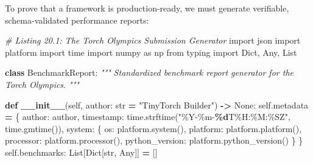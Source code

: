 \documentclass[
  letterpaper,
]{scrbook}
\newenvironment{Shaded}{\begin{snugshade}}{\end{snugshade}}
\newcommand{\BuiltInTok}[1]{#1}
\newcommand{\CommentTok}[1]{\textcolor[rgb]{0.56,0.35,0.01}{\textit{#1}}}
\newcommand{\FunctionTok}[1]{\textcolor[rgb]{0.13,0.29,0.53}{\textbf{#1}}}
\newcommand{\ImportTok}[1]{#1}
\newcommand{\KeywordTok}[1]{\textcolor[rgb]{0.13,0.29,0.53}{\textbf{#1}}}
\newcommand{\NormalTok}[1]{#1}
\newcommand{\OperatorTok}[1]{\textcolor[rgb]{0.81,0.36,0.00}{\textbf{#1}}}
\newcommand{\SpecialCharTok}[1]{\textcolor[rgb]{0.81,0.36,0.00}{\textbf{#1}}}
\newcommand{\StringTok}[1]{\textcolor[rgb]{0.31,0.60,0.02}{#1}}
\newcommand{\VariableTok}[1]{\textcolor[rgb]{0.00,0.00,0.00}{#1}}
\begin{document}
To prove that a framework is production-ready, we must generate
verifiable, schema-validated performance reports:

\begin{Shaded}
\begin{Highlighting}[]
\CommentTok{\# Listing 20.1: The Torch Olympics Submission Generator}
\ImportTok{import}\NormalTok{ json}
\ImportTok{import}\NormalTok{ platform}
\ImportTok{import}\NormalTok{ time}
\ImportTok{import}\NormalTok{ numpy }\ImportTok{as}\NormalTok{ np}
\ImportTok{from}\NormalTok{ typing }\ImportTok{import}\NormalTok{ Dict, Any, List}

\KeywordTok{class}\NormalTok{ BenchmarkReport:}
    \CommentTok{"""}
\CommentTok{    Standardized benchmark report generator for the Torch Olympics.}
\CommentTok{    """}

    \KeywordTok{def} \FunctionTok{\_\_init\_\_}\NormalTok{(}\VariableTok{self}\NormalTok{, author: }\BuiltInTok{str} \OperatorTok{=} \StringTok{"TinyTorch Builder"}\NormalTok{) }\OperatorTok{{-}\textgreater{}} \VariableTok{None}\NormalTok{:}
        \VariableTok{self}\NormalTok{.metadata }\OperatorTok{=}\NormalTok{ \{}
            \StringTok{\textquotesingle{}author\textquotesingle{}}\NormalTok{: author,}
            \StringTok{\textquotesingle{}timestamp\textquotesingle{}}\NormalTok{: time.strftime(}\StringTok{"\%Y{-}\%m{-}}\SpecialCharTok{\%d}\StringTok{T\%H:\%M:\%SZ"}\NormalTok{, time.gmtime()),}
            \StringTok{\textquotesingle{}system\textquotesingle{}}\NormalTok{: \{}
                \StringTok{\textquotesingle{}os\textquotesingle{}}\NormalTok{: platform.system(),}
                \StringTok{\textquotesingle{}platform\textquotesingle{}}\NormalTok{: platform.platform(),}
                \StringTok{\textquotesingle{}processor\textquotesingle{}}\NormalTok{: platform.processor(),}
                \StringTok{\textquotesingle{}python\_version\textquotesingle{}}\NormalTok{: platform.python\_version()}
\NormalTok{            \}}
\NormalTok{        \}}
        \VariableTok{self}\NormalTok{.benchmarks: List[Dict[}\BuiltInTok{str}\NormalTok{, Any]] }\OperatorTok{=}\NormalTok{ []}


\end{Highlighting}
\end{Shaded}
\end{document}
